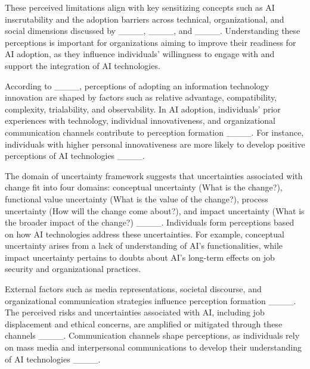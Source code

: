 These perceived limitations align with key sensitizing concepts such as AI inscrutability and the adoption barriers across technical, organizational, and social dimensions discussed by ____, ____, and ____. Understanding these perceptions is important for organizations aiming to improve their readiness for AI adoption, as they influence individuals' willingness to engage with and support the integration of AI technologies.

According to ____, perceptions of adopting an information technology innovation are shaped by factors such as relative advantage, compatibility, complexity, trialability, and observability. In AI adoption, individuals' prior experiences with technology, individual innovativeness, and organizational communication channels contribute to perception formation ____. For instance, individuals with higher personal innovativeness are more likely to develop positive perceptions of AI technologies ____.

The domain of uncertainty framework suggests that uncertainties associated with change fit into four domains: conceptual uncertainty (What is the change?), functional value uncertainty (What is the value of the change?), process uncertainty (How will the change come about?), and impact uncertainty (What is the broader impact of the change?) ____. Individuals form perceptions based on how AI technologies address these uncertainties. For example, conceptual uncertainty arises from a lack of understanding of AI's functionalities, while impact uncertainty pertains to doubts about AI's long-term effects on job security and organizational practices.

External factors such as media representations, societal discourse, and organizational communication strategies influence perception formation ____. The perceived risks and uncertainties associated with AI, including job displacement and ethical concerns, are amplified or mitigated through these channels ____. Communication channels shape perceptions, as individuals rely on mass media and interpersonal communications to develop their understanding of AI technologies ____.

